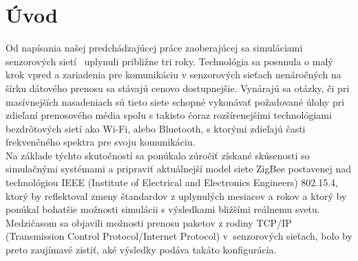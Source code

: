 \chapter{Úvod}

\indent\indent Od napísania našej predchádzajúcej práce zaoberajúcej sa simuláciami senzorových sietí~\cite{halas03} uplynuli približne tri roky. Technológia sa posunula o malý krok vpred a zariadenia pre komunikáciu v senzorových sieťach nenáročných na šírku dátového prenosu sa stávajú cenovo dostupnejšie. Vynárajú sa otázky, či pri masívnejších nasadeniach sú tieto siete schopné vykonávať požadované úlohy pri zdieľaní prenosového média spolu s takisto čoraz rozšírenejšími technológiami bezdrôtových sietí ako Wi-Fi\texttrademark, alebo Bluetooth\texttrademark, s ktorými zdieľajú časti frekvenčného spektra pre svoju komunikáciu.\\
\indent Na základe týchto skutočností sa ponúkalo zúročiť získané skúsenosti so simulačnými systémami a pripraviť aktuálnejší model siete ZigBee postavenej nad technológiou IEEE (Institute of Electrical and Electronics Engineers) 802.15.4\texttrademark, ktorý by reflektoval zmeny štandardov z uplynulých mesiacov a rokov a ktorý by ponúkal bohatšie možnosti simulácii s výsledkami bližšími reálnemu svetu. Medzičasom sa objavili možnosti prenosu paketov z rodiny TCP/IP (Transmission Control Protocol/Internet Protocol) v~senzorových sieťach, bolo by preto zaujímavé zistiť, aké výsledky podáva takáto konfigurácia.